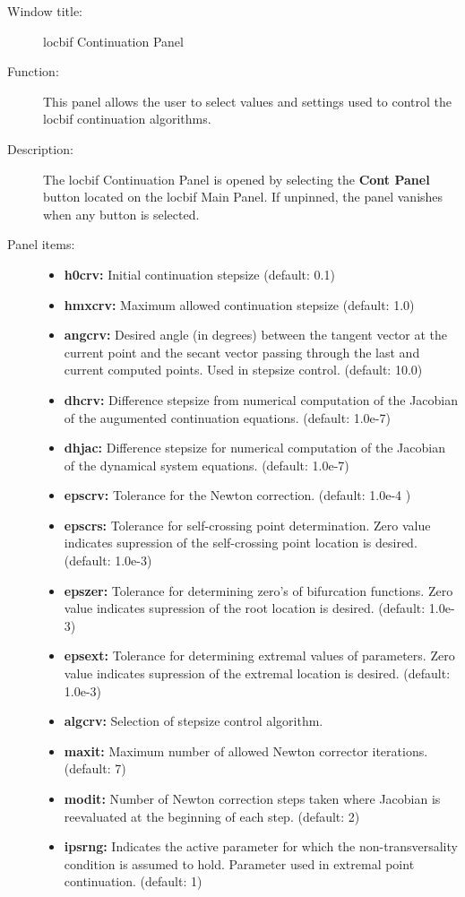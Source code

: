 \begin{description}

\item[Window title:] locbif Continuation Panel
\item[Function:]  This panel allows the user to select values and settings used to control
the locbif continuation algorithms.
\item[Description:] The locbif Continuation Panel is opened by selecting the {\bf Cont Panel}
button located on the locbif Main Panel.  If unpinned, the panel vanishes when any button is selected.

\item[Panel items:]\mbox{}
	\begin{itemize}
		\item {\bf h0crv:} Initial continuation stepsize (default: 0.1) 
		\item {\bf hmxcrv:} Maximum allowed continuation stepsize (default: 1.0) 
		\item {\bf angcrv:} Desired angle (in degrees) between the tangent vector
		      at the current point and the secant vector passing through the last
		      and current computed points.  Used in stepsize control.  (default: 10.0)
		\item {\bf dhcrv:}  Difference stepsize from numerical computation of the
		      Jacobian of the augumented continuation equations. (default: 1.0e-7)
		\item {\bf dhjac:}  Difference stepsize for numerical computation of the 
		      Jacobian of the dynamical system equations. (default: 1.0e-7)
		\item {\bf epscrv:}  Tolerance for the Newton correction. (default: 1.0e-4 )
		\item {\bf epscrs:}  Tolerance for self-crossing point determination.  Zero 
		      value indicates supression of the self-crossing point location is
		      desired.
		      (default: 1.0e-3)
		\item {\bf epszer:}  Tolerance for determining zero's of bifurcation functions.  Zero
		      value indicates supression of the root location is desired.
		      (default: 1.0e-3)
		\item {\bf epsext:}  Tolerance for determining extremal values of parameters.  Zero
		      value indicates supression of the extremal location is desired.
		      (default: 1.0e-3)
		\item {\bf algcrv:}  Selection of stepsize control algorithm. 
		\item {\bf maxit:}  Maximum number of allowed Newton corrector iterations.
		      (default: 7)
		\item {\bf modit:}  Number of Newton correction steps taken where Jacobian is
		      reevaluated at the beginning of each step.
		      (default: 2)
		\item {\bf ipsrng:}  Indicates the active parameter for which the non-transversality
		condition is assumed to hold.  Parameter used in extremal point continuation.
		(default: 1)
        \end{itemize}
\end{description}


